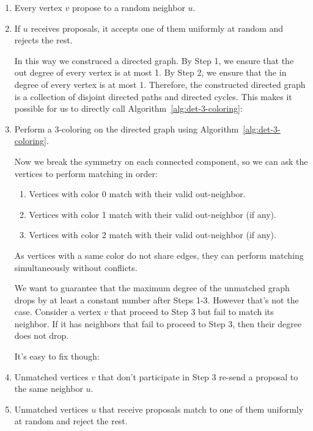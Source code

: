 \begin{enumerate}
  \item Every vertex $v$ propose to a random neighbor $u$.
  \item If $u$ receives proposals, it accepts one of them uniformly at random and rejects the rest.

    In this way we construced a directed graph. By Step 1, we ensure that the out degree of every vertex is at most 1. By Step 2, we ensure that the in degree of every vertex is at most 1. Therefore, the constructed directed graph is a collection of disjoint directed paths and directed cycles. This makes it possible for us to directly call Algorithm~\ref{alg:det-3-coloring}:

  \item Perform a 3-coloring on the directed graph using Algorithm~\ref{alg:det-3-coloring}.

    Now we break the symmetry on each connected component, so we can ask the vertices to perform matching in order:

    \begin{enumerate}
      \item Vertices with color 0 match with their valid out-neighbor.
      \item Vertices with color 1 match with their valid out-neighbor (if any).
      \item Vertices with color 2 match with their valid out-neighbor (if any).
    \end{enumerate}

    As vertices with a same color do not share edges, they can perform matching simultaneously without conflicts.

    We want to guarantee that the maximum degree of the unmatched graph drops by at least a constant number after Steps 1-3. However that's not the case.
    Consider a vertex $v$ that proceed to Step 3 but fail to match its neighbor. If it has neighbors that fail to proceed to Step 3, then their degree does not drop.

    It's easy to fix though:

  \item Unmatched vertices $v$ that don't participate in Step 3 re-send a proposal to the same neighbor $u$.

  \item Unmatched vertices $u$ that receive proposals match to one of them uniformly at random and reject the rest.
\end{enumerate}

